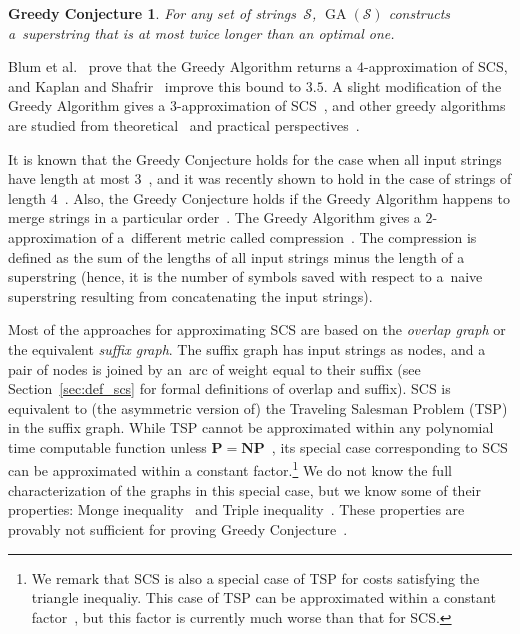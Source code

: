 \newtheorem*{gc}{Greedy Conjecture}
\begin{gc}
For any set of strings~$\mathcal{S}$, $\operatorname{GA}(\mathcal{S})$ constructs a~superstring that is at most twice longer than an optimal one.
\end{gc}


Blum et al.~\cite{BJLTY1991} prove that the Greedy Algorithm returns a $4$-approximation of SCS, and Kaplan and Shafrir~\cite{KS2005} improve this bound to $3.5$. A slight modification of the Greedy Algorithm gives a $3$-approximation of SCS~\cite{BJLTY1991}, and other greedy algorithms are studied from theoretical~\cite{BJLTY1991,rivals2018superstrings} and practical perspectives~\cite{romero2004experimental, cazaux2018practical}.

It is known that the Greedy Conjecture holds for the case when all input strings have length at most $3$~\cite{TU1988, cazaux20143}, and it was recently shown to hold in the case of strings of length $4$~\cite{kulikov2015greedy}. Also, the Greedy Conjecture holds if the Greedy Algorithm happens to merge strings in a particular order~\cite{weinard2006greedy, laube2005conditional}. The Greedy Algorithm gives a $2$-approximation of a~different metric called compression~\cite{TU1988}. The compression is defined as the sum of the lengths of all input strings minus the length of a superstring
(hence, it is the number of symbols saved with respect to a~naive superstring resulting from concatenating the input strings).



Most of the approaches for approximating SCS are based on the
{\em overlap graph} or the equivalent \emph{suffix graph}. The suffix graph has input strings as nodes, and a pair of nodes 
is joined by an~arc of weight equal to their suffix (see Section~\ref{sec:def_scs} for formal definitions of overlap and suffix).
SCS is equivalent to (the asymmetric version of) the Traveling Salesman Problem (TSP) in the suffix graph. While TSP cannot be approximated within any polynomial time computable function unless $\mathbf{P}=\mathbf{NP}$~\cite{SG1976}, its special case corresponding to SCS can be approximated within a constant factor.\footnote{We remark that SCS is also a special case of TSP for costs satisfying the triangle inequaliy. This case of TSP can be approximated within a constant factor~\cite{svensson2018constant}, but this factor is currently much worse than that for SCS.} We do not know the full characterization of the graphs in this special case, but we know some of their properties: Monge inequality~\cite{monge} and Triple inequality~\cite{weinard2006greedy}. These properties are provably not sufficient for proving Greedy Conjecture~\cite{weinard2006greedy, laube2005conditional}. 

